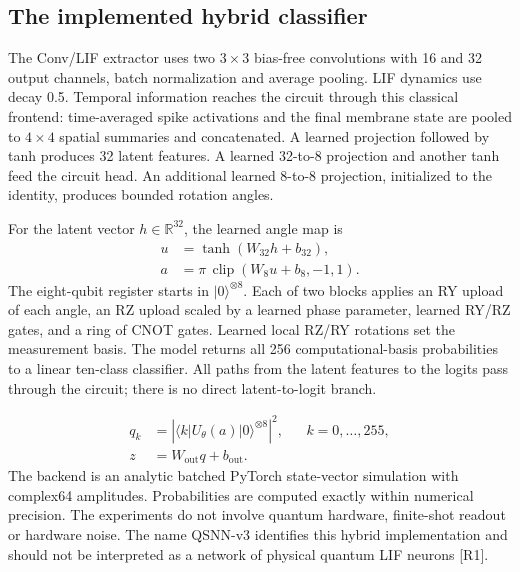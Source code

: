 \subsection{The implemented hybrid classifier}
The Conv/LIF extractor uses two $3\!\times\!3$ bias-free convolutions with 16 and 32 output channels, batch normalization and average pooling. LIF dynamics use decay 0.5. Temporal information reaches the circuit through this classical frontend: time-averaged spike activations and the final membrane state are pooled to $4\!\times\!4$ spatial summaries and concatenated. A learned projection followed by tanh produces 32 latent features. A learned 32-to-8 projection and another tanh feed the circuit head. An additional learned 8-to-8 projection, initialized to the identity, produces bounded rotation angles.


For the latent vector $h\in\mathbb{R}^{32}$, the learned angle map is
\begin{equation}\label{eq:angles}
\begin{aligned}
 u&=\tanh(W_{32}h+b_{32}),\\
 a&=\pi\,\operatorname{clip}(W_8u+b_8,-1,1).
\end{aligned}
\end{equation}
The eight-qubit register starts in $|0\rangle^{\otimes 8}$. Each of two blocks applies an RY upload of each angle, an RZ upload scaled by a learned phase parameter, learned RY/RZ gates, and a ring of CNOT gates. Learned local RZ/RY rotations set the measurement basis. The model returns all 256 computational-basis probabilities to a linear ten-class classifier. All paths from the latent features to the logits pass through the circuit; there is no direct latent-to-logit branch.


\begin{equation}\label{eq:readout}
\begin{aligned}
q_k&=\left|\langle k|U_{\theta}(a)|0\rangle^{\otimes 8}\right|^2,
&& k=0,\ldots,255,\\
z&=W_{\mathrm{out}}q+b_{\mathrm{out}}.
\end{aligned}
\end{equation}
The backend is an analytic batched PyTorch state-vector simulation with complex64 amplitudes. Probabilities are computed exactly within numerical precision. The experiments do not involve quantum hardware, finite-shot readout or hardware noise. The name QSNN-v3 identifies this hybrid implementation and should not be interpreted as a network of physical quantum LIF neurons [R1].

